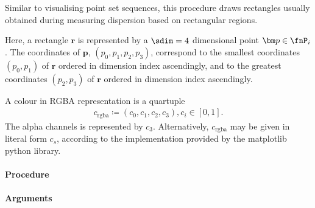 %
Similar to visualising point set sequences, this procedure draws rectangles usually obtained during measuring dispersion based on rectangular regions.

Here, a rectangle $\bm r$ is represented by a $\sdim=4$ dimensional point $\bm p \in \fnP_i$. The coordinates of $\bm p$, $(p_0, p_1, p_2, p_3)$, correspond to the smallest coordinates $(p_0, p_1)$ of $\bm r$ ordered in dimension index ascendingly, and to the greatest coordinates $(p_2, p_3)$ of $\bm r$ ordered in dimension index ascendingly.

A colour in RGBA representation is a quartuple 
\begin{align*}
  c_{\text{rgba}} \coloneqq (c_0, c_1, c_2, c_3), c_i \in [0,1].
\end{align*}
The alpha channels is represented by $c_3$. Alternatively, $c_{\text{rgba}}$ may be given in literal form $c_s$, according to the implementation provided by the matplotlib python library.


\paragraph{Procedure}

\begin{synopsis}
\end{synopsis}


\paragraph{Arguments}

\procarginseq{\ptseqsize}

